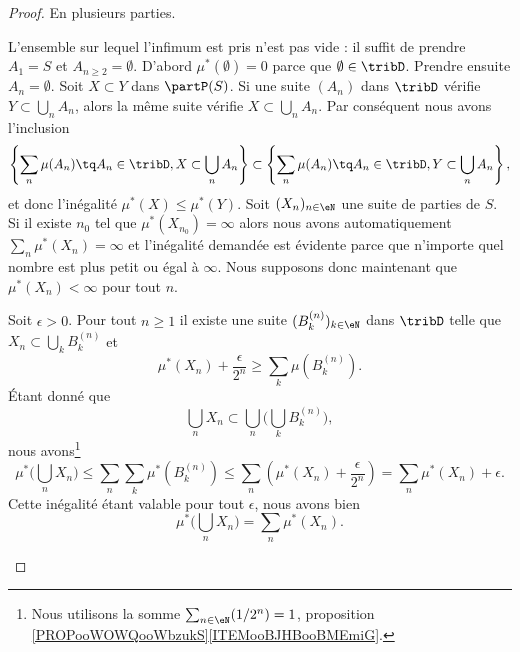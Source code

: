 \begin{proof}
	En plusieurs parties.
	\begin{subproof}
		L'ensemble sur lequel l'infimum est pris n'est pas vide : il suffit de prendre \( A_1=S\) et \( A_{n\geq 2}=\emptyset\).
		\spitem[Le vide]
		D'abord \( \mu^*(\emptyset)=0\) parce que \( \emptyset\in\tribD\). Prendre ensuite \( A_n=\emptyset\).
		Soit \( X\subset Y\) dans \( \partP(S)\). Si une suite \( (A_n)\) dans \( \tribD\) vérifie \( Y\subset \bigcup_nA_n\), alors la même suite vérifie \( X\subset\bigcup_nA_n\). Par conséquent nous avons l'inclusion
		\begin{equation}
			\left\{ \sum_n\mu(A_n)\tq A_n\in\tribD,X\subset\bigcup_nA_n \right\} \subset\left\{ \sum_n\mu(A_n)\tq A_n\in\tribD,Y\subset\bigcup_nA_n \right\} ,
		\end{equation}
		et donc l'inégalité \( \mu^*(X)\leq \mu^*(Y)\).
		Soit \( (X_n)_{n\in \eN}\) une suite de parties de \( S\). Si il existe \( n_0\) tel que \( \mu^*(X_{n_0})=\infty\) alors nous avons automatiquement \( \sum_n\mu^*(X_n)=\infty\) et l'inégalité demandée est évidente parce que n'importe quel nombre est plus petit ou égal à \( \infty\). Nous supposons donc maintenant que \( \mu^*(X_n)<\infty\) pour tout \( n\).

		Soit \( \epsilon>0\). Pour tout \( n\geq 1\) il existe une suite \( (B_k^{(n)})_{k\in \eN}\) dans \( \tribD\) telle que \( X_n\subset\bigcup_kB_k^{(n)}\) et
		\begin{equation}
			\mu^*(X_n)+\frac{ \epsilon }{ 2^n }\geq \sum_k\mu(B_k^{(n)}).
		\end{equation}
		Étant donné que
		\begin{equation}
			\bigcup_nX_n\subset\bigcup_n\big( \bigcup_kB_k^{(n)} \big),
		\end{equation}
		nous avons\footnote{Nous utilisons la somme \( \sum_{n\in \eN}(1/2^n)=1\), proposition \ref{PROPooWOWQooWbzukS}\ref{ITEMooBJHBooBMEmiG}.}
		\begin{equation}
			\mu^*\big( \bigcup_nX_n \big)\leq \sum_n\sum_k\mu^*(B_k^{(n)})\leq \sum_n\left( \mu^*(X_n)+\frac{ \epsilon }{ 2^n } \right)=\sum_n\mu^*(X_n)+\epsilon.
		\end{equation}
		Cette inégalité étant valable pour tout \( \epsilon\), nous avons bien
		\begin{equation}
			\mu^*\big( \bigcup_nX_n \big)=\sum_n\mu^*(X_n).
		\end{equation}


\end{subproof}
\end{proof}
